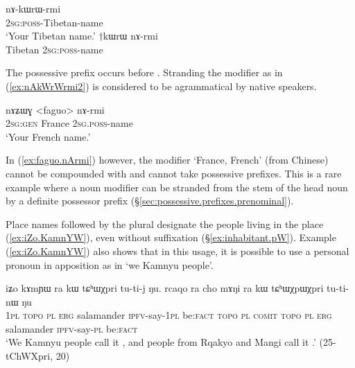 \begin{exe}
		\ex  \label{ex:nAkWrWrmi}
		\gll nɤ-kɯrɯ-rmi   \\
		\textsc{2sg}:\textsc{poss}-Tibetan-name \\
		\glt `Your Tibetan name.' 
		\ex  \label{ex:nAkWrWrmi2}
		\gll $\dagger$kɯrɯ nɤ-rmi   \\
		Tibetan \textsc{2sg}:\textsc{poss}-name \\		
\end{exe}

The possessive prefix occurs before . Stranding the modifier as in (\ref{ex:nAkWrWrmi2}) is considered to be agrammatical by native speakers.
 
\begin{exe}
	\ex  \label{ex:faguo.nArmi}
	\gll nɤʑɯɣ <faguo> nɤ-rmi   \\
	\textsc{2sg}:\textsc{gen} France \textsc{2sg}.\textsc{poss}-name \\
	\glt `Your French name.' 
\end{exe}
 
 
In (\ref{ex:faguo.nArmi}) however, the modifier  `France, French' (from Chinese) cannot be compounded with   and cannot take possessive prefixes. This is a rare example where a noun modifier can be stranded from the stem of the head noun by a definite possessor prefix (§\ref{sec:possessive.prefixes.prenominal}).

 
Place names followed by the plural  designate the people living in the place (\ref{ex:iZo.KamnYW}), even without  suffixation (§\ref{ex:inhabitant.pW}). Example (\ref{ex:iZo.KamnYW}) also shows that in this usage, it is possible to use a personal pronoun in apposition as in  `we Kamnyu people'.

\begin{exe}
\ex \label{ex:iZo.KamnYW}
 \gll iʑo kɤmɲɯ ra kɯ tɕʰɯχpri tu-ti-j ŋu. rcaqo ra cho mɤŋi ra kɯ tɕʰɯχpɯχpri tu-ti-nɯ ŋu \\
 \textsc{1pl}  \textsc{topo} \textsc{pl} \textsc{erg} salamander \textsc{ipfv}-say-\textsc{1pl} be:\textsc{fact}  \textsc{topo} \textsc{pl} \textsc{comit}  \textsc{topo} \textsc{pl} \textsc{erg}  salamander \textsc{ipfv}-say-\textsc{pl} be:\textsc{fact} \\
 \glt `We Kamnyu people call it , and people from Rqakyo and Mangi call it .' (25-tChWXpri, 20)
\end{exe}


